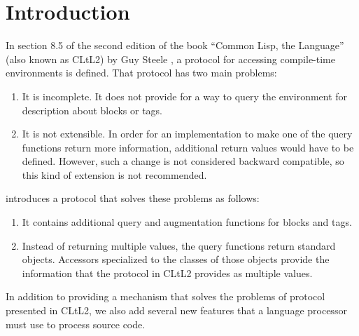 \chapter{Introduction}
%

In section 8.5 of the second edition of the book ``Common Lisp, the
Language'' (also known as CLtL2) by Guy Steele
\cite{Steele:1990:CLL:95411}, a protocol for accessing compile-time
environments is defined.  That protocol has two main problems:

\begin{enumerate}
\item It is incomplete.  It does not provide for a way to query the
  environment for description about blocks or tags.
\item It is not extensible.  In order for an implementation to make
  one of the query functions return more information, additional
  return values would have to be defined.  However, such a change is
  not considered backward compatible, so this kind of extension is not
  recommended.
\end{enumerate}

\sysname{} introduces a protocol that solves these problems as
follows:

\begin{enumerate}
\item It contains additional query and augmentation functions for
  blocks and tags.
\item Instead of returning multiple values, the query functions return
  standard objects.  Accessors specialized to the classes of those
  objects provide the information that the protocol in CLtL2
  provides as multiple values.
\end{enumerate}

In addition to providing a mechanism that solves the problems of
protocol presented in CLtL2, we also add several new features that
a language processor must use to process source code.
